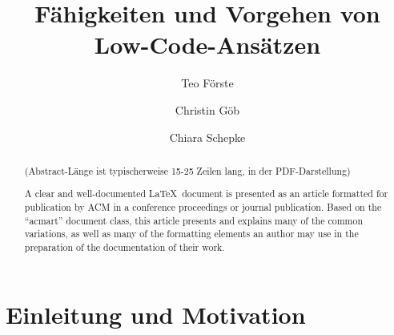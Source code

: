 \documentclass[acmtog, language=ngerman]{acmart}
\begin{document}

\title{Fähigkeiten und Vorgehen von Low-Code-Ansätzen}

\author{Teo Förste}
\author{Christin Göb}
\authornotemark[1]
\author{Chiara Schepke}
\authornotemark[1]
\renewcommand{\shortauthors}{Förste, Göb, Schepke}

\begin{abstract}
  (Abstract-Länge ist typischerweise 15-25 Zeilen lang, in der PDF-Darstellung) 
  
  A clear and well-documented \LaTeX\ document is presented as an
  article formatted for publication by ACM in a conference proceedings
  or journal publication. Based on the ``acmart'' document class, this
  article presents and explains many of the common variations, as well
  as many of the formatting elements an author may use in the
  preparation of the documentation of their work.
\end{abstract}

\maketitle

\section{Einleitung und Motivation}
\end{document}
